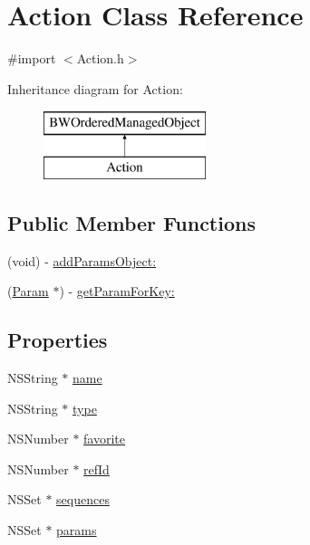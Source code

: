 \hypertarget{interface_action}{
\section{Action Class Reference}
\label{interface_action}
}


{\ttfamily \#import $<$Action.h$>$}

Inheritance diagram for Action:\begin{figure}[H]
\begin{center}
\leavevmode
\includegraphics[height=2.000000cm]{interface_action}
\end{center}
\end{figure}
\subsection*{Public Member Functions}
\begin{DoxyCompactItemize}
\item 
(void) -\/ \hyperlink{interface_action_a32f962aa26fe070eeb2618c5a49f739c}{addParamsObject:}
\item 
(\hyperlink{interface_param}{Param} $\ast$) -\/ \hyperlink{interface_action_ac6bb8aa2487ca6dd7e6319b44d65488c}{getParamForKey:}
\end{DoxyCompactItemize}
\subsection*{Properties}
\begin{DoxyCompactItemize}
\item 
NSString $\ast$ \hyperlink{interface_action_a4b93d352d2fca75b34e1b5a50e03f587}{name}
\item 
NSString $\ast$ \hyperlink{interface_action_abff6a04d71c2bba87e646615388a1f5c}{type}
\item 
NSNumber $\ast$ \hyperlink{interface_action_adf700105022080ae6b26ce9ad3369901}{favorite}
\item 
NSNumber $\ast$ \hyperlink{interface_action_ae24e2568d0d3a40bebefe304cb92656c}{refId}
\item 
NSSet $\ast$ \hyperlink{interface_action_a4cb3c561b838983ae43c00bf45aa2059}{sequences}
\item 
NSSet $\ast$ \hyperlink{interface_action_a0e40d62a824c738e0c18d38b114cb378}{params}
\end{DoxyCompactItemize}


